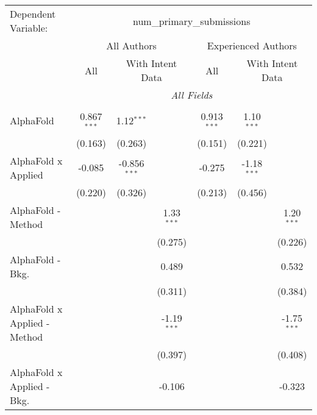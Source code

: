 \begingroup
\centering
\begin{tabular}{lcccccc}
   \tabularnewline \midrule \midrule
   Dependent Variable: & \multicolumn{6}{c}{num\_primary\_submissions}\\
 & \multicolumn{3}{c}{All Authors} & \multicolumn{3}{c}{Experienced Authors} \\
\cmidrule(lr){2-4} \cmidrule(lr){5-7}
 & \multicolumn{1}{c}{All} & \multicolumn{2}{c}{With Intent Data} & \multicolumn{1}{c}{All} & \multicolumn{2}{c}{With Intent Data} \\
\cmidrule(lr){2-2} \cmidrule(lr){3-4} \cmidrule(lr){5-5} \cmidrule(lr){6-7}
 & \multicolumn{6}{c}{\textit{All Fields}} \\ \\
   AlphaFold                      & 0.867$^{***}$ & 1.12$^{***}$   &               & 0.913$^{***}$ & 1.10$^{***}$  &   \\   
                                  & (0.163)       & (0.263)        &               & (0.151)       & (0.221)       &   \\   
   AlphaFold x Applied            & -0.085        & -0.856$^{***}$ &               & -0.275        & -1.18$^{***}$ &   \\   
                                  & (0.220)       & (0.326)        &               & (0.213)       & (0.456)       &   \\   
   AlphaFold - Method             &               &                & 1.33$^{***}$  &               &               & 1.20$^{***}$\\   
                                  &               &                & (0.275)       &               &               & (0.226)\\   
   AlphaFold - Bkg.               &               &                & 0.489         &               &               & 0.532\\   
                                  &               &                & (0.311)       &               &               & (0.384)\\   
   AlphaFold x Applied - Method   &               &                & -1.19$^{***}$ &               &               & -1.75$^{***}$\\   
                                  &               &                & (0.397)       &               &               & (0.408)\\   
   AlphaFold x Applied - Bkg.     &               &                & -0.106        &               &               & -0.323\\   

\end{tabular}
